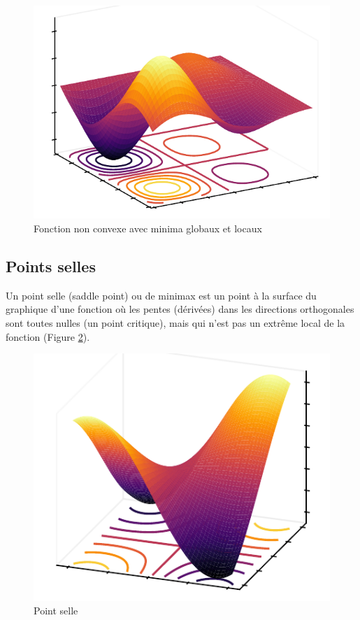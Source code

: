 \begin{figure}[h]
    \centering
    \includegraphics{figures/global_local_minima.pdf}
    \caption{Fonction non convexe avec minima globaux et locaux}
    \label{fig:global_local_minima}
\end{figure}

\subsection{Points selles}
Un point selle (saddle point) ou de minimax est un point à la surface du graphique d'une fonction où les pentes (dérivées) dans les directions orthogonales sont toutes nulles (un point critique), mais qui n'est pas un extrême local de la fonction (Figure \ref{fig:saddle-point}).

\begin{figure}[h]
    \centering
    \includegraphics{figures/saddle_point.pdf}
    \caption{Point selle}
    \label{fig:saddle-point}
\end{figure}

